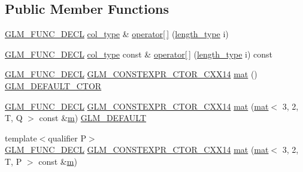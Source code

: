 \subsection*{Public Member Functions}
\begin{DoxyCompactItemize}
\item 
\hyperlink{setup_8hpp_ab2d052de21a70539923e9bcbf6e83a51}{G\+L\+M\+\_\+\+F\+U\+N\+C\+\_\+\+D\+E\+CL} \hyperlink{structglm_1_1mat_3_013_00_012_00_01_t_00_01_q_01_4_aa610dcaaae528e1eea8bdaaa435ad3a4}{col\+\_\+type} \& \hyperlink{structglm_1_1mat_3_013_00_012_00_01_t_00_01_q_01_4_ab749a8bb52d92b278cdfdd6de7201b03}{operator\mbox{[}$\,$\mbox{]}} (\hyperlink{structglm_1_1mat_3_013_00_012_00_01_t_00_01_q_01_4_ac2f268fa5e899b2a6ad8139183ed61d4}{length\+\_\+type} i)
\item 
\hyperlink{setup_8hpp_ab2d052de21a70539923e9bcbf6e83a51}{G\+L\+M\+\_\+\+F\+U\+N\+C\+\_\+\+D\+E\+CL} \hyperlink{structglm_1_1mat_3_013_00_012_00_01_t_00_01_q_01_4_aa610dcaaae528e1eea8bdaaa435ad3a4}{col\+\_\+type} const  \& \hyperlink{structglm_1_1mat_3_013_00_012_00_01_t_00_01_q_01_4_a73a97c49ef108592edf14b0ac70f8264}{operator\mbox{[}$\,$\mbox{]}} (\hyperlink{structglm_1_1mat_3_013_00_012_00_01_t_00_01_q_01_4_ac2f268fa5e899b2a6ad8139183ed61d4}{length\+\_\+type} i) const
\item 
\hyperlink{setup_8hpp_ab2d052de21a70539923e9bcbf6e83a51}{G\+L\+M\+\_\+\+F\+U\+N\+C\+\_\+\+D\+E\+CL} \hyperlink{setup_8hpp_a0900f9145e68bf6061b6f5e7be3fa751}{G\+L\+M\+\_\+\+C\+O\+N\+S\+T\+E\+X\+P\+R\+\_\+\+C\+T\+O\+R\+\_\+\+C\+X\+X14} \hyperlink{structglm_1_1mat_3_013_00_012_00_01_t_00_01_q_01_4_a20c83ce0aec4f293bfb3923b465fe495}{mat} () \hyperlink{setup_8hpp_afb97a4e995bc004c0cbbfa22125b80ba}{G\+L\+M\+\_\+\+D\+E\+F\+A\+U\+L\+T\+\_\+\+C\+T\+OR}
\item 
\hyperlink{setup_8hpp_ab2d052de21a70539923e9bcbf6e83a51}{G\+L\+M\+\_\+\+F\+U\+N\+C\+\_\+\+D\+E\+CL} \hyperlink{setup_8hpp_a0900f9145e68bf6061b6f5e7be3fa751}{G\+L\+M\+\_\+\+C\+O\+N\+S\+T\+E\+X\+P\+R\+\_\+\+C\+T\+O\+R\+\_\+\+C\+X\+X14} \hyperlink{structglm_1_1mat_3_013_00_012_00_01_t_00_01_q_01_4_aae7ec73b0747140723ff9678e024ad52}{mat} (\hyperlink{structglm_1_1mat}{mat}$<$ 3, 2, T, Q $>$ const \&\hyperlink{_s_d_l__opengl__glext_8h_af593500c283bf1a787a6f947f503a5c2}{m}) \hyperlink{setup_8hpp_aefce7051c376a64ba89fa93a9f63bc2c}{G\+L\+M\+\_\+\+D\+E\+F\+A\+U\+LT}
\item 
{\footnotesize template$<$qualifier P$>$ }\\\hyperlink{setup_8hpp_ab2d052de21a70539923e9bcbf6e83a51}{G\+L\+M\+\_\+\+F\+U\+N\+C\+\_\+\+D\+E\+CL} \hyperlink{setup_8hpp_a0900f9145e68bf6061b6f5e7be3fa751}{G\+L\+M\+\_\+\+C\+O\+N\+S\+T\+E\+X\+P\+R\+\_\+\+C\+T\+O\+R\+\_\+\+C\+X\+X14} \hyperlink{structglm_1_1mat_3_013_00_012_00_01_t_00_01_q_01_4_a8caa3e3cecef45b321fa2583052b643c}{mat} (\hyperlink{structglm_1_1mat}{mat}$<$ 3, 2, T, P $>$ const \&\hyperlink{_s_d_l__opengl__glext_8h_af593500c283bf1a787a6f947f503a5c2}{m})

\end{DoxyCompactItemize}

